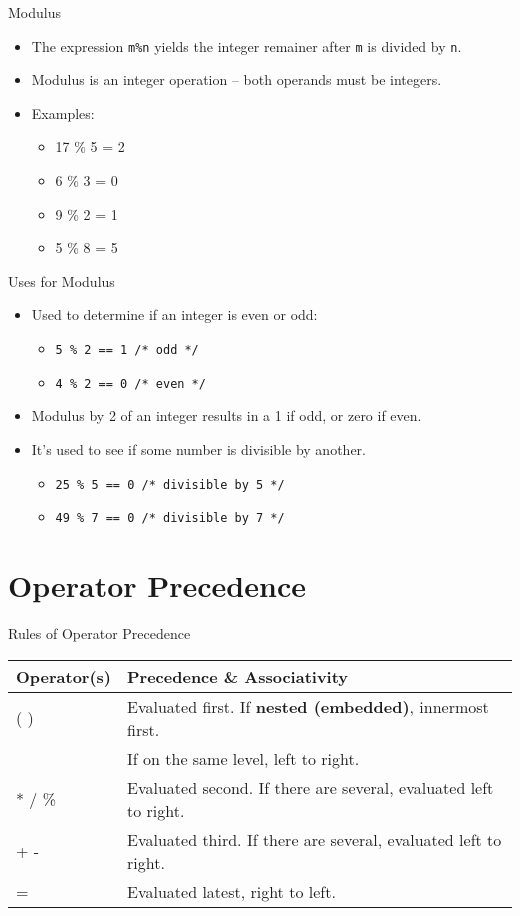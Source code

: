 \documentclass[graphics]{beamer}
\begin{document}
\begin{frame}{Modulus}
    \begin{itemize}
        \item The expression \texttt{m\%n} yields the integer remainer after \texttt{m} is divided by \texttt{n}.
        \item Modulus is an integer operation -- both operands must be integers.
        \item Examples:
        \begin{itemize}
            \item 17 \% 5 = 2
            \item 6 \% 3 = 0
            \item 9 \% 2 = 1
            \item 5 \% 8 = 5
        \end{itemize}
    \end{itemize}
\end{frame}

\begin{frame}{Uses for Modulus}
    \begin{itemize}
        \item Used to determine if an integer is even or odd:
        \begin{itemize}
            \item \texttt{5 \% 2 == 1 /* odd */}
            \item \texttt{4 \% 2 == 0 /* even */}
        \end{itemize}
        \item Modulus by 2 of an integer results in a 1 if odd, or zero if even.
        \item It's used to see if some number is divisible by another.
        \begin{itemize}
            \item \texttt{25 \% 5 == 0 /* divisible by 5 */}
            \item \texttt{49 \% 7 == 0 /* divisible by 7 */}
        \end{itemize}
    \end{itemize}
\end{frame}

\section*{Operator Precedence}\label{sec:opprec}
\begin{frame}{Rules of Operator Precedence}
    \begin{tabular}{l l}
        Operator(s) & Precedence \& Associativity \\ \hline
        ( ) & Evaluated first. If \textbf{nested (embedded)}, innermost first. \\
        & If on the same level, left to right. \\
        * / \% & Evaluated second. If there are several, evaluated left to right. \\
        + - & Evaluated third. If there are several, evaluated left to right. \\
        = & Evaluated latest, right to left.
    \end{tabular}
\end{frame}
\end{document}
